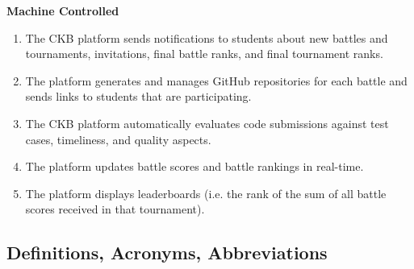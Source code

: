 \textbf{Machine Controlled}
\begin{enumerate}[resume]
    \item The CKB platform sends notifications to students about new battles and tournaments, invitations, final battle ranks, and final tournament ranks.
    \item The platform generates and manages GitHub repositories for each battle and sends links to students that are participating.
    \item The CKB platform automatically evaluates code submissions against test cases, timeliness, and quality aspects.
    \item The platform updates battle scores and battle rankings in real-time.
    \item The platform displays leaderboards (i.e. the rank of the sum of all battle scores received in that tournament).
\end{enumerate}

\subsection{Definitions, Acronyms, Abbreviations}

